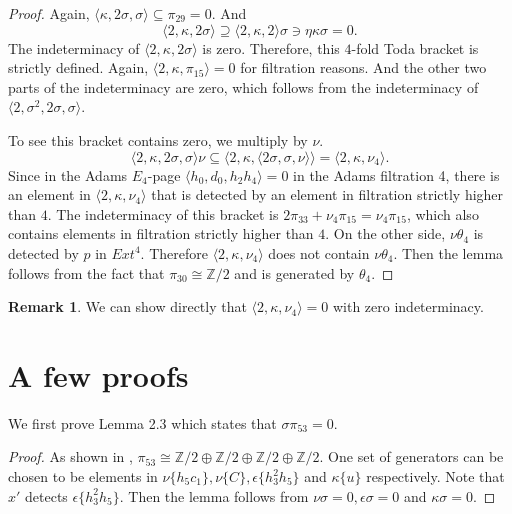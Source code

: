\documentclass[psamsfonts]{amsart}
\theoremstyle{definition}
\newtheorem{rem}[thm]{Remark}
\numberwithin{equation}{section}
\begin{document}
\begin{proof}
Again, $\langle\kappa, 2 \sigma, \sigma\rangle \subseteq \pi_{29} =0$. And
$$\langle 2, \kappa, 2 \sigma\rangle \supseteq \langle 2, \kappa, 2\rangle\sigma \ni \eta \kappa \sigma =0.$$
The indeterminacy of $\langle 2, \kappa, 2 \sigma\rangle$ is zero. Therefore, this $4$-fold Toda bracket is strictly defined. Again, $\langle 2, \kappa, \pi_{15}\rangle = 0$ for filtration reasons. And the other two parts of the indeterminacy are zero, which follows from the indeterminacy of $\langle 2, \sigma^2, 2 \sigma, \sigma \rangle$.

To see this bracket contains zero, we multiply by $\nu$.
$$\langle 2, \kappa, 2\sigma, \sigma \rangle\nu \subseteq \langle 2, \kappa, \langle 2\sigma, \sigma, \nu \rangle\rangle=\langle 2, \kappa, \nu_4\rangle.$$
Since in the Adams $E_4$-page $\langle h_0, d_0, h_2h_4\rangle = 0$ in the Adams filtration 4, there is an element in $\langle 2, \kappa, \nu_4\rangle$ that is detected by an element in filtration strictly higher than $4$. The indeterminacy of this bracket is $2\pi_{33}+\nu_4\pi_{15}=\nu_4\pi_{15}$, which also contains elements in filtration strictly higher than $4$.  On the other side, $\nu\theta_4$ is detected by $p$ in $Ext^4$. Therefore $\langle 2, \kappa, \nu_4\rangle$ does not contain $\nu\theta_4$. Then the lemma follows from the fact that $\pi_{30}\cong \mathbb{Z}/2$ and is generated by $\theta_4$.
\end{proof}

\begin{rem}
We can show directly that $\langle 2, \kappa, \nu_4\rangle=0$ with zero indeterminacy.
\end{rem}

\section{A few proofs}

We first prove Lemma 2.3 which states that $\sigma\pi_{53}=0$.

\begin{proof}
As shown in \cite{DI1}, $\pi_{53}\cong\mathbb{Z}/2\oplus\mathbb{Z}/2\oplus\mathbb{Z}/2\oplus\mathbb{Z}/2$. One set of generators can be chosen to be elements in $\nu\{h_5c_1\}, \nu\{C\}, \epsilon\{h_3^2h_5\}$ and $\kappa\{u\}$ respectively. Note that $x'$ detects $\epsilon\{h_3^2h_5\}$. Then the lemma follows from $\nu\sigma=0, \epsilon\sigma=0$ and $\kappa\sigma=0$.
\end{proof}
\end{document}
